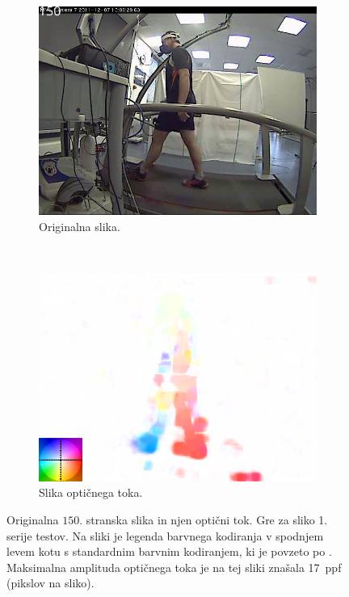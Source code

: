 \begin{figure}[!htb]
	\centering
	\begin{subfigure}{0.45\columnwidth}
		\includegraphics[width=\columnwidth]{./Slike/normal-sv-150.png}
		\caption{Originalna slika.}
	\end{subfigure}
	~
	\begin{subfigure}{0.45\columnwidth}
	    \includegraphics[width=\columnwidth, frame]{./Slike/normal-sv-of-coded-150.png}
		\caption{Slika optičnega toka.}
		\label{fig:stage1-of}
	\end{subfigure}
    \caption[Originalna $150$. stranska slika in optični tok]{Originalna $150$. stranska slika in njen optični tok. Gre za sliko 1. serije testov. Na sliki  je legenda barvnega kodiranja v spodnjem levem kotu s standardnim barvnim kodiranjem, ki je povzeto po \cite{baker2011database}. Maksimalna amplituda optičnega toka je na tej sliki znašala \SI{17}{ppf} (pikslov na sliko).}
    \label{fig:opticni-tok-stage1}
\end{figure}

